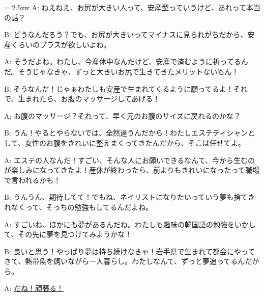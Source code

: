 \documentclass[11pt]{amsart}
\title{}
\author{}
\newenvironment{hangall}[1]{\hangindent = 2.5zw\everypar{\hangindent = 2.5zw}}{}
\begin{document}
\maketitle
\begin{hangall}{}%
A: ねえねえ、お尻が大きい人って、安産型っていうけど、あれって本当の話？

B: どうなんだろう？でも、お尻が大きいってマイナスに見られがちだから、安産くらいのプラスが欲しいよね。

A: そうだよね。わたし、今産休中なんだけど、安産で済むように祈ってるんだ。そうじゃなきゃ、ずっと大きいお尻で生きてきたメリットないもん！

B: そうなんだ！じゃぁわたしも安産で生まれてくるように願ってるよ！それで、生まれたら、お腹のマッサージしてあげる！

A: お腹のマッサージ？それって、早く元のお腹のサイズに戻れるのかな？

B: うん！やるとやらないでは、全然違うんだから！わたしエステティシャンとして、女性のお腹をきれいに整えまくってきたんだから、そこは任せてよ。

A: エステの人なんだ！すごい、そんな人にお願いできるなんて、今から生むのが楽しみになってきたよ！産休が終わったら、前よりもきれいになったって職場で言われるかも！

B: うんうん、期待してて！でもね、ネイリストになりたいっていう夢も捨てきれなくって、そっちの勉強もしてるんだよね。

A: すごいね、ほかにも夢があるんだね。わたしも趣味の韓国語の勉強をいかして、その先に夢を見つけてみようかな！

B: 良いと思う！やっぱり夢は持ち続けなきゃ！岩手県で生まれて都会にやってきて、熱帯魚を飼いながら一人暮らし。わたしなんて、ずっと夢追ってるんだから。

A: \ul{だね！頑張る！}\end{hangall}
\end{document}
